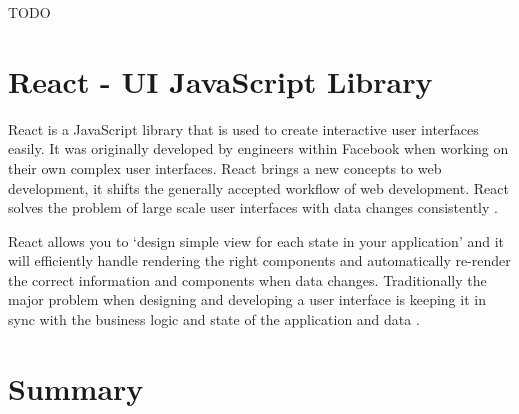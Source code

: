 TODO

\section{React - UI JavaScript Library}

React is a JavaScript library that is used to create interactive user interfaces easily. It was originally developed by engineers within Facebook when working on their own complex user interfaces. React brings a new concepts to web development, it shifts the generally accepted workflow of web development. React solves the problem of large scale user interfaces with data changes consistently \cite{reactintro2015}.

React allows you to `design simple view for each state in your application' and it will efficiently handle rendering the right components and automatically re-render the correct information and components when data changes\cite{react}. Traditionally the major problem when designing and developing a user interface is keeping it in sync with the business logic and state of the application and data \cite{staff2016react}.

\section{Summary}